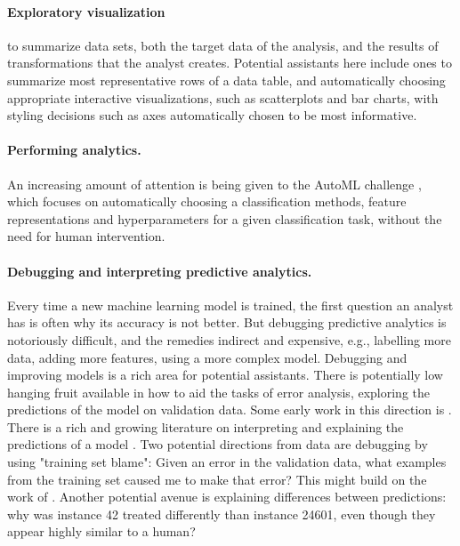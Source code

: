\documentclass[sigplan,preprint,10pt]{acmart}\settopmatter{printfolios=true,printccs=false,printacmref=false}
\theoremstyle{plain}
\theoremstyle{definition}
\begin{document}
{{\paragraph{Exploratory visualization} to summarize
data sets, both the target data of the analysis,
and the results of transformations that the analyst
creates. Potential assistants here include ones
to summarize most representative rows of a data table,
and automatically choosing appropriate interactive
visualizations, such as scatterplots and bar charts,
with styling decisions such as axes automatically
chosen to be most informative.

\paragraph{Performing analytics.}
An increasing amount of attention is being
given to the AutoML challenge \cite{guyon_review_2016}, which focuses
on automatically choosing a classification
methods, feature representations and hyperparameters
for a given classification task, without the need for human intervention.

\paragraph{Debugging and interpreting predictive analytics.}
Every time a new machine learning model is trained,
the first question an analyst has is often
why its accuracy is not better. But
debugging predictive analytics is notoriously difficult, and the remedies indirect and expensive,
 e.g., labelling more data, adding more features,
 using a more complex model. Debugging and improving
 models is a rich area for potential assistants.
 There is potentially low hanging fruit available
 in how to aid the tasks of
error analysis, exploring the
predictions of the model
on validation data. Some early work in this direction is
\cite{saleema}.
There is a rich and growing literature on
interpreting and explaining the predictions
of a model \cite{lipton:mythos,doshi-velez17,ribiero2016lime,darksight}.
Two potential directions from data are
debugging by using
"training set blame": Given an error in the validation data, what examples from the training set caused me to make that error? This might build on the work of \cite{percy}.
Another potential avenue is explaining
differences between predictions: why was instance 42 treated differently than instance 24601, even though they appear highly similar to a human?
}

}
\end{document}
